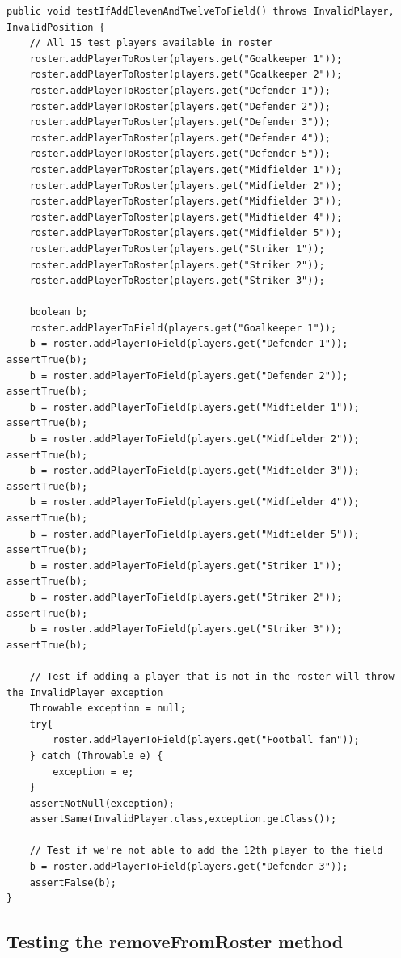 \documentclass{article}
\begin{document}
\begin{lstlisting}
public void testIfAddElevenAndTwelveToField() throws InvalidPlayer, InvalidPosition {
	// All 15 test players available in roster
	roster.addPlayerToRoster(players.get("Goalkeeper 1"));
	roster.addPlayerToRoster(players.get("Goalkeeper 2"));
	roster.addPlayerToRoster(players.get("Defender 1"));
	roster.addPlayerToRoster(players.get("Defender 2"));
	roster.addPlayerToRoster(players.get("Defender 3"));
	roster.addPlayerToRoster(players.get("Defender 4"));
	roster.addPlayerToRoster(players.get("Defender 5"));
	roster.addPlayerToRoster(players.get("Midfielder 1"));
	roster.addPlayerToRoster(players.get("Midfielder 2"));
	roster.addPlayerToRoster(players.get("Midfielder 3"));
	roster.addPlayerToRoster(players.get("Midfielder 4"));
	roster.addPlayerToRoster(players.get("Midfielder 5"));
	roster.addPlayerToRoster(players.get("Striker 1"));
	roster.addPlayerToRoster(players.get("Striker 2"));
	roster.addPlayerToRoster(players.get("Striker 3"));
	
	boolean b;
	roster.addPlayerToField(players.get("Goalkeeper 1"));	
	b = roster.addPlayerToField(players.get("Defender 1"));		assertTrue(b);
	b = roster.addPlayerToField(players.get("Defender 2"));		assertTrue(b);
	b = roster.addPlayerToField(players.get("Midfielder 1"));	assertTrue(b);
	b = roster.addPlayerToField(players.get("Midfielder 2"));	assertTrue(b);
	b = roster.addPlayerToField(players.get("Midfielder 3"));	assertTrue(b);
	b = roster.addPlayerToField(players.get("Midfielder 4"));	assertTrue(b);
	b = roster.addPlayerToField(players.get("Midfielder 5"));	assertTrue(b);
	b = roster.addPlayerToField(players.get("Striker 1"));		assertTrue(b);
	b = roster.addPlayerToField(players.get("Striker 2"));		assertTrue(b);
	b = roster.addPlayerToField(players.get("Striker 3"));		assertTrue(b);
	
	// Test if adding a player that is not in the roster will throw the InvalidPlayer exception
	Throwable exception = null;
	try{
		roster.addPlayerToField(players.get("Football fan"));
	} catch (Throwable e) {
		exception = e;
	}
	assertNotNull(exception);
	assertSame(InvalidPlayer.class,exception.getClass());
	
	// Test if we're not able to add the 12th player to the field
	b = roster.addPlayerToField(players.get("Defender 3"));
	assertFalse(b);
}
\end{lstlisting}

\subsection{Testing the removeFromRoster method}
\end{document}
